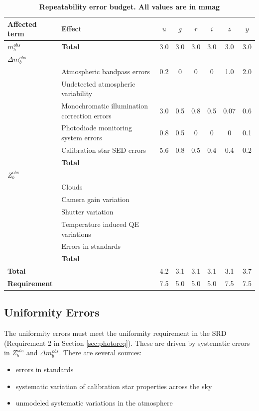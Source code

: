 \documentclass[12pt,preprint]{aastex}
\begin{document}
\begin{center}
\begin{table}[htb]
\caption{{\bf Repeatability error budget.  All values are in mmag} }
\begin{tabular}{l | l | c c c c c c }
Affected term & Effect &  $u$  & $g$ & $r$ & $i$ & $z$ & $y$ \\ \hline
{\bf $m_b^{obs}$} & {\bf Total} & 3.0 & 3.0 & 3.0 & 3.0 & 3.0 & 3.0 \\ \hline
{\bf $\Delta m_b^{obs}$} & & & & \\
& Atmospheric bandpass errors & 0.2 & 0 & 0 & 0 & 1.0 & 2.0  \\
& Undetected atmospheric variability & & & \\
& Monochromatic illumination correction errors & 3.0 & 0.5 & 0.8 & 0.5 & 0.07 & 0.6\\
& Photodiode monitoring system errors & 0.8 & 0.5 & 0 & 0 & 0 & 0.1 \\
& Calibration star SED errors & 5.6 & 0.8 & 0.5 & 0.4 & 0.4 & 0.2 \\ 
& {\bf Total} & & & \\ \hline
$Z_b^{obs}$ & & & & \\
& Clouds & & &  \\
& Camera gain variation & & & \\
& Shutter variation & & & \\
& Temperature induced QE variations & & & \\
& Errors in standards & & & \\
& {\bf Total} & & & \\ \hline
{\bf Total} & & 4.2 & 3.1 & 3.1 & 3.1 & 3.1 & 3.7 \\ \hline
{\bf Requirement} & & 7.5 & 5.0 & 5.0 & 5.0 & 7.5 & 7.5 \\ 
\end{tabular}
\label{tab:rpt_error_budget}
\end{table}
\end{center}


\subsection{Uniformity Errors}
The uniformity errors must meet the uniformity requirement in the SRD (Requirement 2 in Section \ref{sec:photoreq}).  These are driven by systematic errors in $Z_b^{obs}$ and $\Delta m_b^{obs}$.  There are several sources:
\begin{itemize}
\item{errors in standards}
\item{systematic variation of calibration star properties across the sky}
\item{unmodeled systematic variations in the atmosphere}
\end{itemize}
\end{document}
